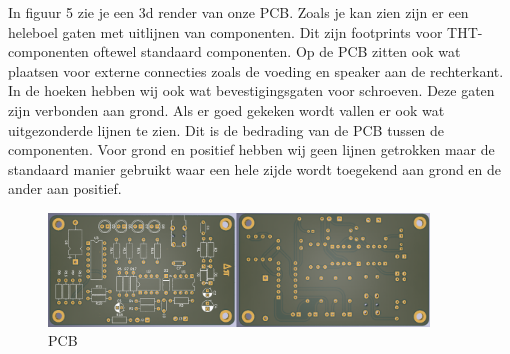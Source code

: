 \newpage
In figuur 5 zie je een 3d render van onze PCB. Zoals je kan zien zijn er een heleboel gaten met uitlijnen van componenten. Dit zijn footprints voor THT-componenten oftewel standaard componenten. Op de PCB zitten ook wat plaatsen voor externe connecties zoals de voeding en speaker aan de rechterkant. In de hoeken hebben wij ook wat bevestigingsgaten voor schroeven. Deze gaten zijn verbonden aan grond. Als er goed gekeken wordt vallen er ook wat uitgezonderde lijnen te zien. Dit is de bedrading van de PCB tussen de componenten. Voor grond en positief hebben wij geen lijnen getrokken maar de standaard manier gebruikt waar een hele zijde wordt toegekend aan grond en de ander aan positief. 
 
\begin{figure}[ht]
    \centering
    \includegraphics[width=0.90\textwidth]{IMG/004/PCB.png}
    \caption{PCB}
    \label{fig:PCB}
\end{figure}